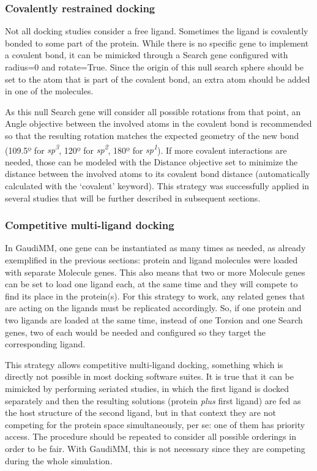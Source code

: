 \subsubsection{Covalently restrained docking}
Not all docking studies consider a free ligand. Sometimes the ligand is covalently bonded to some part of the protein. While there is no specific gene to implement a covalent bond, it can be mimicked through a Search gene configured with radius=0 and rotate=True. Since the origin of this null search sphere should be set to the atom that is part of the covalent bond, an extra atom should be added in one of the molecules.

As this null Search gene will consider all possible rotations from that point, an Angle objective between the involved atoms in the covalent bond is recommended so that the resulting rotation matches the expected geometry of the new bond (109.5º for \textit{sp\textsuperscript{3}}, 120º for \textit{sp\textsuperscript{2}}, 180º for \textit{sp\textsuperscript{1}}). If more covalent interactions are needed, those can be modeled with the Distance objective set to minimize the distance between the involved atoms to its covalent bond distance (automatically calculated with the ‘covalent’ keyword). This strategy was successfully applied in several studies that will be further described in subsequent sections.

\subsubsection{Competitive multi-ligand docking}
In GaudiMM, one gene can be instantiated as many times as needed, as already exemplified in the previous sections: protein and ligand molecules were loaded with separate Molecule genes. This also means that two or more Molecule genes can be set to load one ligand each, at the same time and they will compete to find its place in the protein(s). For this strategy to work, any related genes that are acting on the ligands must be replicated accordingly. So, if one protein and two ligands are loaded at the same time, instead of one Torsion and one Search genes, two of each would be needed and configured so they target the corresponding ligand.

This strategy allows competitive multi-ligand docking, something which is directly not possible in most docking software suites. It is true that it can be mimicked by performing seriated studies, in which the first ligand is docked separately and then the resulting solutions (protein \textit{plus} first ligand) are fed as the host structure of the second ligand, but in that context they are not competing for the protein space simultaneously, per se: one of them has priority access. The procedure should be repeated to consider all possible orderings in order to be fair. With GaudiMM, this is not necessary since they are competing during the whole simulation.

